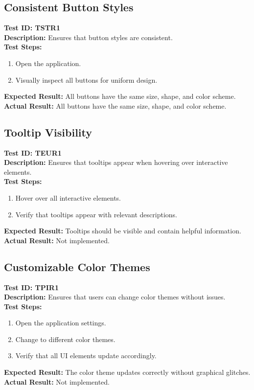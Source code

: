 \documentclass[12pt, titlepage]{article}
\begin{document}
\subsection{Consistent Button Styles}
\textbf{Test ID: TSTR1}\\
\textbf{Description:} Ensures that button styles are consistent.\\
\textbf{Test Steps:}
\begin{enumerate}
    \item Open the application.
    \item Visually inspect all buttons for uniform design.
\end{enumerate}
\textbf{Expected Result:} All buttons have the same size, shape, and color scheme.\\
\textbf{Actual Result:} All buttons have the same size, shape, and color scheme.

\subsection{Tooltip Visibility}
\textbf{Test ID: TEUR1}\\
\textbf{Description:} Ensures that tooltips appear when hovering over interactive elements.\\
\textbf{Test Steps:}
\begin{enumerate}
    \item Hover over all interactive elements.
    \item Verify that tooltips appear with relevant descriptions.
\end{enumerate}
\textbf{Expected Result:} Tooltips should be visible and contain helpful information.\\
\textbf{Actual Result:} Not implemented.

\subsection{Customizable Color Themes}
\textbf{Test ID: TPIR1}\\
\textbf{Description:} Ensures that users can change color themes without issues.\\
\textbf{Test Steps:}
\begin{enumerate}
    \item Open the application settings.
    \item Change to different color themes.
    \item Verify that all UI elements update accordingly.
\end{enumerate}
\textbf{Expected Result:} The color theme updates correctly without graphical glitches.\\
\textbf{Actual Result:} Not implemented.
\end{document}
